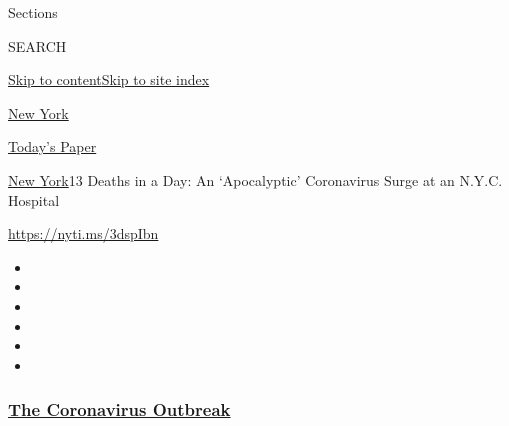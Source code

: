 Sections

SEARCH

\protect\hyperlink{site-content}{Skip to
content}\protect\hyperlink{site-index}{Skip to site index}

\href{https://www.nytimes3xbfgragh.onion/section/nyregion}{New York}

\href{https://myaccount.nytimes3xbfgragh.onion/auth/login?response_type=cookie\&client_id=vi}{}

\href{https://www.nytimes3xbfgragh.onion/section/todayspaper}{Today's
Paper}

\href{/section/nyregion}{New York}\textbar{}13 Deaths in a Day: An
`Apocalyptic' Coronavirus Surge at an N.Y.C. Hospital

\url{https://nyti.ms/3dspIbn}

\begin{itemize}
\item
\item
\item
\item
\item
\item
\end{itemize}

\hypertarget{the-coronavirus-outbreak}{%
\subsubsection{\texorpdfstring{\href{https://www.nytimes3xbfgragh.onion/news-event/coronavirus?name=styln-coronavirus-national\&region=TOP_BANNER\&block=storyline_menu_recirc\&action=click\&pgtype=Article\&impression_id=0f99bf10-f4ba-11ea-84d7-4d6fc60db97f\&variant=undefined}{The
Coronavirus
Outbreak}}{The Coronavirus Outbreak}}\label{the-coronavirus-outbreak}}

